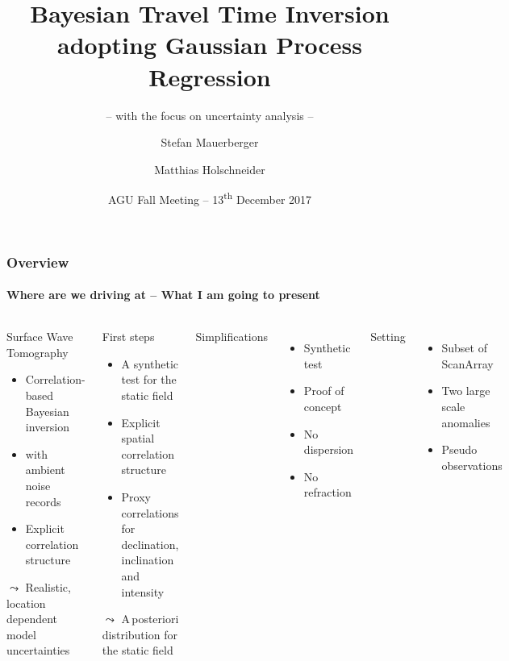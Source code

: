 \documentclass[aspectratio=169, t, 10pt]{beamer}
\title[Correlation based travel time inversion]{Bayesian Travel Time Inversion adopting Gaussian Process Regression}
\subtitle{-- with the focus on uncertainty analysis --}
\author[\tt mauerber@uni-potsdam.de]{Stefan Mauerberger \and Matthias Holschneider}
\institute[Math@UP]{University Potsdam, Institute of Mathematics}
\date[AGU~2017]{AGU Fall Meeting -- 13\textsuperscript{th} December 2017}
\begin{document}



\begin{frame}
    \frametitle{Overview}
    \framesubtitle{Where are we driving at -- What I am going to present}

\begin{columns}

    \begin{block}{Surface Wave Tomography}
        \begin{itemize}
            \item Correlation-based Bayesian inversion
            \item with ambient noise records
            \item Explicit correlation structure
        \end{itemize}
        \hfill {\Large $\leadsto$} Realistic, location dependent model uncertainties ~
    \end{block}

    \begin{exampleblock}{First steps}
        \begin{itemize}
            \item A synthetic test for the static field
            \item Explicit spatial correlation structure
            \item Proxy correlations for declination, inclination and intensity
        \end{itemize}
        \hfill {\Large $\leadsto$} A\,posteriori distribution for the static field ~
    \end{exampleblock}


    Simplifications
    \begin{itemize}
        \item Synthetic test
        \item Proof of concept
        \item No dispersion
        \item No refraction
    \end{itemize}

    Setting
    \begin{itemize}
        \item Subset of ScanArray \SFWnst
        \item Two large scale anomalies
        \item Pseudo observations
    \end{itemize}


    \vspace{-10mm}
    
\end{columns}

\end{frame}
\end{document}
